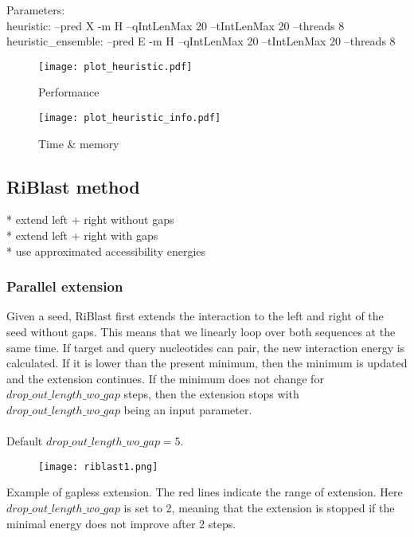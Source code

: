 Parameters:\\
heuristic: --pred X -m H --qIntLenMax 20 --tIntLenMax 20 --threads 8\\
heuristic\_ensemble: --pred E -m H --qIntLenMax 20 --tIntLenMax 20 --threads 8\\

\begin{figure}[H]
	\centering
	\caption{Performance}
	\texttt{[image: plot\_heuristic.pdf]}
\end{figure}

\begin{figure}[H]
	\centering
	\caption{Time \& memory}
	\texttt{[image: plot\_heuristic\_info.pdf]}
\end{figure}

\clearpage

\subsection{RiBlast method}

* extend left + right without gaps\\
* extend left + right with gaps\\
* use approximated accessibility energies\\

\subsubsection{Parallel extension}

Given a seed, RiBlast first extends the interaction to the left and right of the seed without gaps. This means that we linearly loop over both sequences at the same time. If target and query nucleotides can pair, the new interaction energy is calculated. If it is lower than the present minimum, then the minimum is updated and the extension continues. If the minimum does not change for $drop\_out\_length\_wo\_gap$ steps, then the extension stops with $drop\_out\_length\_wo\_gap$ being an input parameter.
\\\\
Default $drop\_out\_length\_wo\_gap = 5$.

\begin{figure}[H]
	\centering
	\texttt{[image: riblast1.png]}
\end{figure}

Example of gapless extension. The red lines indicate the range of extension. Here $drop\_out\_length\_wo\_gap$ is set to 2, meaning that the extension is stopped if the minimal energy does not improve after 2 steps.

